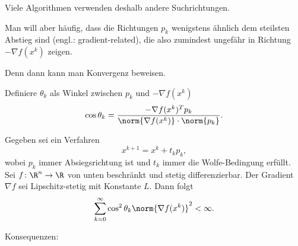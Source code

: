 Viele Algorithmen verwenden deshalb andere Suchrichtungen.

Man will aber häufig, dass die Richtungen $p_k$ wenigstens ähnlich dem steilsten Abstieg sind (engl.: gradient-related),
die also zumindest ungefähr in Richtung $-\nabla f(x^k)$ zeigen.

Denn dann kann man Konvergenz beweisen.

Definiere $\theta_k$ als Winkel zwischen $p_k$ und $-\nabla f (x^k )$
\begin{equation*}
 \cos \theta_k=\frac{-\nabla f (x^k )^T p_k}{\norm{\nabla f(x^k)} \cdot \norm{p_k}}.
\end{equation*}

\begin{satz}
\label{thm:gradient_related_convergence}
Gegeben sei ein Verfahren
\begin{equation*}
 x^{k+1}=x^k+t_kp_k,
\end{equation*}
wobei $p_k$ immer Absiegsrichtung ist und $t_k$ immer die Wolfe-Bedingung erfüllt.
Sei $f \colon \R^n \to \R$ von unten beschränkt und stetig differenzierbar.
Der Gradient $\nabla f$ sei Lipschitz-stetig mit Konstante $L$. Dann folgt
\begin{equation*}
 \sum_{k=0}^{\infty} \cos^2 \theta_k \norm{\nabla f(x^k)}^2 < \infty.
\end{equation*}
\end{satz}
Konsequenzen:
